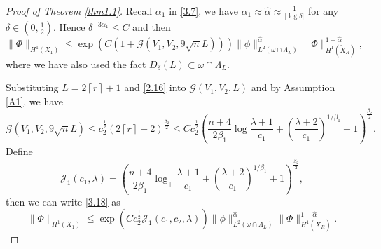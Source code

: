 \documentclass{article}
\numberwithin{equation}{section}
\numberwithin{equation}{section}
\theoremstyle{definition}
\begin{document}
\begin{proof}[Proof of Theorem \ref{thm1.1}]
	Recall $\alpha_1$ in \eqref{3.7}, we have $\alpha_1 \approx \hat{\alpha}\approx \frac{1}{|\log \delta|}$ for any $\delta \in (0, \frac{1}{2})$. Hence $\delta ^{-3 \alpha_1}\le C$ and then
	\begin{equation}\label{3.18}
		\|\Phi\|_{H^{1}\left( X_1 \right) }\le \exp \left( C\left( 1+\mathcal{G}\left( V_1,V_2,9 \sqrt{n} L \right)  \right)  \right) \|\phi\|^{\hat{\alpha}}_{L^2\left( \omega \cap \Lambda_L \right) }\|\Phi\|^{1-\hat{\alpha}}_{H^{1}(\widetilde{X}_{R})},
	\end{equation}
where we have also used the fact $D_\delta (L)\subset \omega \cap \Lambda_L$.

Substituting $L=2\left\lceil r \right\rceil +1$ and \eqref{2.16} into $\mathcal{G}(V_1,V_2,L)$ and by Assumption \ref{A1}, we have
\begin{equation}
	\mathcal{G}(V_1,V_2,9 \sqrt{n} L)\le c_2^{\frac{1}{2}} \left( 2\left\lceil r \right\rceil +2 \right) ^{\frac{\beta_2}{2}}\le C c_2^{\frac{1}{2}} \left( \frac{n+4}{2\beta_1}\log \frac{\lambda+1}{c_1}+\left( \frac{\lambda+2}{c_1} \right) ^{1 /\beta_1} +1 \right) ^{\frac{\beta_2}{2}}. 
\end{equation}
Define
\begin{equation}\label{j.1}
	\mathcal{J}_1(c_1,\lambda)= \left( \frac{n+4}{2\beta_1}\log_+ \frac{\lambda+1}{c_1}+\left( \frac{\lambda+2}{c_1} \right)^{1 / \beta_1} +1 \right)^{\frac{\beta_2}{2}}, 
\end{equation}
then we can write \eqref{3.18} as 
\begin{equation}\label{3.20}
	\|\Phi\|_{H^{1}\left( X_1 \right) }\le \exp \left( C c_2^{\frac{1}{2}} \mathcal{J}_1(c_1,c_2,\lambda) \right) \|\phi\|^{\hat{\alpha}}_{L^2\left( \omega \cap \Lambda_L \right) }\|\Phi\|^{1- \hat{\alpha}}_{H^{1}\left( \widetilde{X}_{R} \right) }. 
\end{equation}


\end{proof}
\end{document}
